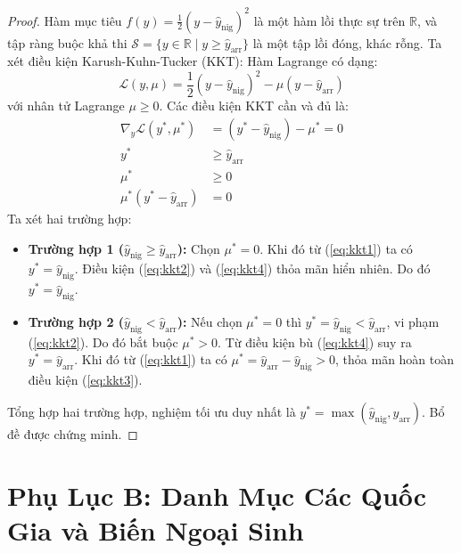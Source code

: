 \begin{proof}
Hàm mục tiêu $f(y) = \frac{1}{2}(y - \hat{y}_{\text{nig}})^2$ là một hàm lồi thực sự trên $\mathbb{R}$, và tập ràng buộc khả thi $\mathcal{S} = \{y \in \mathbb{R} \mid y \ge \hat{y}_{\text{arr}}\}$ là một tập lồi đóng, khác rỗng.
Ta xét điều kiện Karush-Kuhn-Tucker (KKT):
Hàm Lagrange có dạng:
\begin{equation}
    \mathcal{L}(y, \mu) = \frac{1}{2} (y - \hat{y}_{\text{nig}})^2 - \mu (y - \hat{y}_{\text{arr}})
\end{equation}
với nhân tử Lagrange $\mu \ge 0$.
Các điều kiện KKT cần và đủ là:
\begin{align}
    \nabla_y \mathcal{L}(y^*, \mu^*) &= (y^* - \hat{y}_{\text{nig}}) - \mu^* = 0 \label{eq:kkt1} \\
    y^* &\ge \hat{y}_{\text{arr}} \label{eq:kkt2} \\
    \mu^* &\ge 0 \label{eq:kkt3} \\
    \mu^* (y^* - \hat{y}_{\text{arr}}) &= 0 \label{eq:kkt4}
\end{align}
Ta xét hai trường hợp:
\begin{itemize}
    \item \textbf{Trường hợp 1 ($\hat{y}_{\text{nig}} \ge \hat{y}_{\text{arr}}$):} Chọn $\mu^* = 0$. Khi đó từ (\ref{eq:kkt1}) ta có $y^* = \hat{y}_{\text{nig}}$. Điều kiện (\ref{eq:kkt2}) và (\ref{eq:kkt4}) thỏa mãn hiển nhiên. Do đó $y^* = \hat{y}_{\text{nig}}$.
    \item \textbf{Trường hợp 2 ($\hat{y}_{\text{nig}} < \hat{y}_{\text{arr}}$):} Nếu chọn $\mu^* = 0$ thì $y^* = \hat{y}_{\text{nig}} < \hat{y}_{\text{arr}}$, vi phạm (\ref{eq:kkt2}). Do đó bắt buộc $\mu^* > 0$. Từ điều kiện bù (\ref{eq:kkt4}) suy ra $y^* = \hat{y}_{\text{arr}}$. Khi đó từ (\ref{eq:kkt1}) ta có $\mu^* = \hat{y}_{\text{arr}} - \hat{y}_{\text{nig}} > 0$, thỏa mãn hoàn toàn điều kiện (\ref{eq:kkt3}).
\end{itemize}
Tổng hợp hai trường hợp, nghiệm tối ưu duy nhất là $y^* = \max(\hat{y}_{\text{nig}}, \hat{y}_{\text{arr}})$. Bổ đề được chứng minh.
\end{proof}

\section*{Phụ Lục B: Danh Mục Các Quốc Gia và Biến Ngoại Sinh}
\label{sec:appendix_countries}

